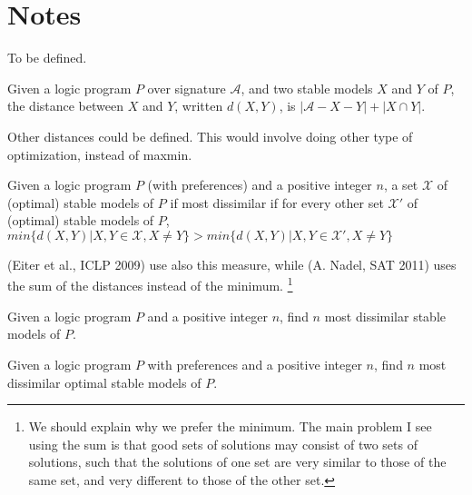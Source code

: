 \documentclass[a4paper,10pt]{article}
\date{03.11.2015}
\begin{document}
 
\section{Notes}\label{sec:notes}

\begin{definition}
To be defined.
\end{definition}

\begin{definition}[Distance]
Given a logic program $P$ over signature $\mathcal{A}$, 
and two stable models $X$ and $Y$ of $P$, 
the distance between $X$ and $Y$, written $d(X,Y)$, is $|\mathcal{A} - X - Y| + | X \cap Y |$.
\end{definition}
Other distances could be defined. 
This would involve doing other type of optimization, instead of maxmin.

\begin{definition}
Given a logic program $P$ (with preferences) and a positive integer $n$, 
a set $\mathcal{X}$ of (optimal) stable models of $P$ if most dissimilar if
for every other set $\mathcal{X'}$ of (optimal) stable models of $P$, 
$
min \{ d(X,Y) | X, Y \in \mathcal{X}, X \neq Y \} > 
min \{ d(X,Y) | X, Y \in \mathcal{X'}, X \neq Y \}
$
\end{definition}
(Eiter et al., ICLP 2009) use also this measure, 
while (A. Nadel, SAT 2011) uses the sum of the distances instead of the minimum.
\footnote{
We should explain why we prefer the minimum.
The main problem I see using the sum is that good sets of solutions
may consist of two sets of solutions, 
such that the solutions of one set are very similar to those of the same set, 
and very different to those of the other set.}

\begin{definition}
Given a logic program $P$ and a positive integer $n$, 
find $n$ most dissimilar stable models of $P$.
\end{definition}

\begin{definition}
Given a logic program $P$ with preferences and a positive integer $n$, 
find $n$ most dissimilar optimal stable models of $P$.
\end{definition}
\end{document}

